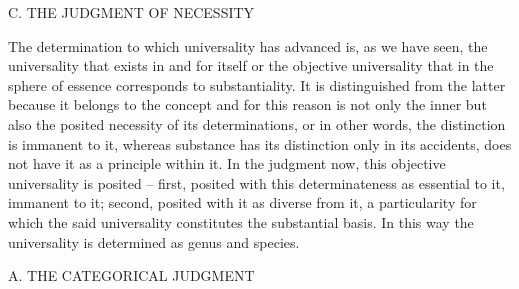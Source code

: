 C. THE JUDGMENT OF NECESSITY

The determination to which universality has advanced is, as we have seen,
the universality that exists in and for itself or the objective universality that
in the sphere of essence corresponds to substantiality. It is distinguished
from the latter because it belongs to the concept and for this reason is not
only the inner but also the posited necessity of its determinations, or in
other words, the distinction is immanent to it, whereas substance has its
distinction only in its accidents, does not have it as a principle within it.
In the judgment now, this objective universality is posited – first, posited
with this determinateness as essential to it, immanent to it; second, posited
with it as diverse from it, a particularity for which the said universality
constitutes the substantial basis. In this way the universality is determined
as genus and species.

A. THE CATEGORICAL JUDGMENT

